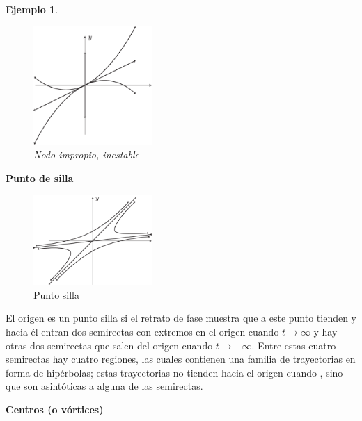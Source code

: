 \documentclass[a5paper,doc,10pt,noapacite]{apa6}
\newtheorem{ejem}{Ejemplo}
\begin{document}
{{\begin{ejem}
	\vspace{-1\baselineskip}
	\begin{figure}[H]
		\captionsetup{justification=centering, labelfont=footnotesize, font=footnotesize}
		\centering
		\includegraphics[width=4.5cm]{Graficos/figura4}
		\caption{Nodo impropio, inestable}
		\label{fig:M-4}
	\end{figure}
\end{ejem}



%
\vspace{0.75\baselineskip}
	\textbf{Punto de silla}\newline

\vspace{-1\baselineskip}
	\begin{figure}[H]
		\captionsetup{justification=centering, labelfont=footnotesize, font=footnotesize}
		\centering
		\includegraphics[width=4.5cm]{Graficos/figura5}
		\caption{Punto silla}
		\label{fig:M-5}
	\end{figure}

El origen es un punto silla si el retrato de fase muestra que a este punto tienden y hacia él entran dos semirectas con extremos en el origen cuando \(t\to\infty\) y hay otras dos semirectas que salen del origen cuando \(t\to-\infty\). Entre estas cuatro semirectas hay cuatro regiones, las cuales contienen una familia de trayectorias en forma de hipérbolas; estas trayectorias no tienden hacia el origen cuando , sino que son asintóticas a alguna de las semirectas. 

%
\vspace{0.75\baselineskip}
	\textbf{Centros (o vórtices)}\newline

}}
\end{document}
